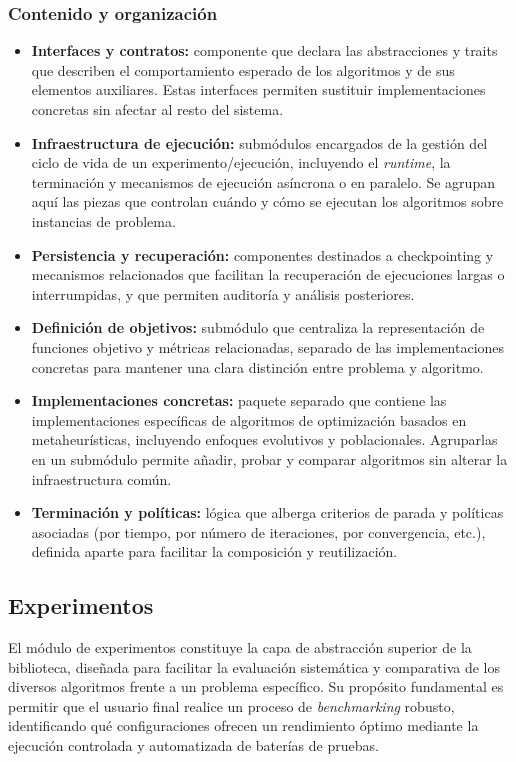 \documentclass[12pt,a4paper,twoside,openright]{book}
\begin{document}
    \subsubsection{Contenido y organización}
        \begin{itemize}
        \item \textbf{Interfaces y contratos:} componente que declara las abstracciones y traits que describen el comportamiento esperado de los algoritmos y de sus elementos auxiliares. Estas interfaces permiten sustituir implementaciones concretas sin afectar al resto del sistema.
        \item \textbf{Infraestructura de ejecución:} submódulos encargados de la gestión del ciclo de vida de un experimento/ejecución, incluyendo el \emph{runtime}, la terminación y mecanismos de ejecución asíncrona o en paralelo. Se agrupan aquí las piezas que controlan cuándo y cómo se ejecutan los algoritmos sobre instancias de problema.
        \item \textbf{Persistencia y recuperación:} componentes destinados a checkpointing y mecanismos relacionados que facilitan la recuperación de ejecuciones largas o interrumpidas, y que permiten auditoría y análisis posteriores.
        \item \textbf{Definición de objetivos:} submódulo que centraliza la representación de funciones objetivo y métricas relacionadas, separado de las implementaciones concretas para mantener una clara distinción entre problema y algoritmo.
        \item \textbf{Implementaciones concretas:} paquete separado que contiene las implementaciones específicas de algoritmos de optimización basados en metaheurísticas, incluyendo enfoques evolutivos y poblacionales. Agruparlas en un submódulo permite añadir, probar y comparar algoritmos sin alterar la infraestructura común.
        \item \textbf{Terminación y políticas:} lógica que alberga criterios de parada y políticas asociadas (por tiempo, por número de iteraciones, por convergencia, etc.), definida aparte para facilitar la composición y reutilización.
        \end{itemize}



    \subsection{Experimentos}
        El módulo de experimentos constituye la capa de abstracción superior de la biblioteca, diseñada para facilitar la evaluación sistemática y comparativa de los diversos algoritmos frente a un problema específico. Su propósito fundamental es permitir que el usuario final realice un proceso de \emph{benchmarking} robusto, identificando qué configuraciones ofrecen un rendimiento óptimo mediante la ejecución controlada y automatizada de baterías de pruebas.
\end{document}
